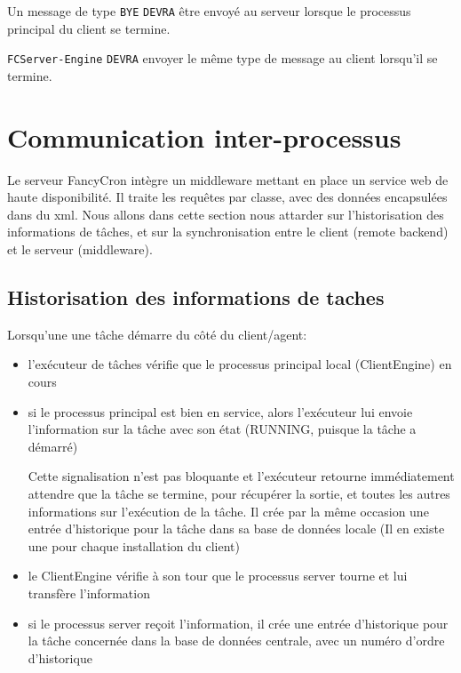 \documentclass{bouygues-fr}
\begin{document}
Un message de type \texttt{BYE} \texttt{DEVRA} être envoyé au serveur lorsque le processus principal du client se termine.

\texttt{FCServer-Engine} \texttt{DEVRA} envoyer le même type de message au client lorsqu'il se termine.

\vspace{20pt}
\section{Communication inter-processus}
Le serveur FancyCron intègre un middleware mettant en place un service web de haute disponibilité. Il traite les requêtes par classe, avec des données encapsulées dans du xml. Nous allons dans cette section nous attarder sur l'historisation des informations de tâches, et sur la synchronisation entre le client (remote backend) et le serveur (middleware).

\subsection{Historisation des informations de taches}
Lorsqu'une une tâche démarre du côté du client/agent:
\begin{itemize}
\item l'exécuteur de tâches vérifie que le processus principal local (ClientEngine) en cours
\item si le processus principal est bien en service, alors l'exécuteur lui envoie l'information sur la tâche avec son état (RUNNING, puisque la tâche a démarré)
  
  Cette signalisation n'est pas bloquante et l'exécuteur retourne immédiatement attendre que la tâche se termine, pour récupérer la sortie, et toutes les autres informations sur l'exécution de la tâche. Il crée par la même occasion une entrée d'historique pour la tâche dans sa base de données locale (Il en existe une pour chaque installation du client)
\item le ClientEngine vérifie à son tour que le processus server tourne et lui transfère l'information
\item si le processus server reçoit l'information, il crée une entrée d'historique pour la tâche concernée dans la base de données centrale, avec un numéro d'ordre d'historique
\end{itemize}
\end{document}
